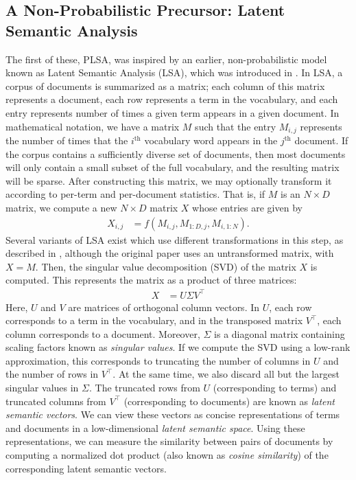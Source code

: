 \documentclass{article}
\newcommand{\nth}{^{\text{th}}}
\begin{document}
\subsection{A Non-Probabilistic Precursor: Latent Semantic Analysis}

The first of these, PLSA, was inspired by an earlier, non-probabilistic model known as Latent Semantic Analysis (LSA), which was introduced in \cite{deerwester1990lsa}.
In LSA, a corpus of documents is summarized as a matrix; each column of this matrix represents a document, each row represents a term in the vocabulary, and each entry represents number of times a given term appears in a given document.
In mathematical notation, we have a matrix $M$ such that the entry $M_{i,j}$ represents the number of times that the $i\nth$ vocabulary word appears in the $j\nth$ document.
If the corpus contains a sufficiently diverse set of documents, then most documents will only contain a small subset of the full vocabulary, and the resulting matrix will be sparse.
After constructing this matrix, we may optionally transform it according to per-term and per-document statistics.
That is, if $M$ is an $N \times D$ matrix, we compute a new $N \times D$ matrix $X$ whose entries are given by
\begin{align}
X_{i,j} &= f(M_{i,j}, M_{1:D,j}, M_{i,1:N}).
\end{align}
Several variants of LSA exist which use different transformations in this step, as described in \cite{wiki:lsa}, although the original paper \cite{deerwester1990lsa} uses an untransformed matrix, with $X = M$.
Then, the singular value decomposition (SVD) of the matrix $X$ is computed.
This represents the matrix as a product of three matrices:
\begin{align}
X &= U \Sigma V^\top
\end{align}
Here, $U$ and $V$ are matrices of orthogonal column vectors.
In $U$, each row corresponds to a term in the vocabulary, and in the transposed matrix $V^\top$, each column corresponds to a document.
Moreover, $\Sigma$ is a diagonal matrix containing scaling factors known as \emph{singular values}.
If we compute the SVD using a low-rank approximation, this corresponds to truncating the number of columns in $U$ and the number of rows in $V^\top$.
At the same time, we also discard all but the largest singular values in $\Sigma$.
The truncated rows from $U$ (corresponding to terms) and truncated columns from $V^\top$ (corresponding to documents) are known as \emph{latent semantic vectors}.
We can view these vectors as concise representations of terms and documents in a low-dimensional \emph{latent semantic space}.
Using these representations, we can measure the similarity between pairs of documents by computing a normalized dot product (also known as \emph{cosine similarity}) of the corresponding latent semantic vectors.
\end{document}
